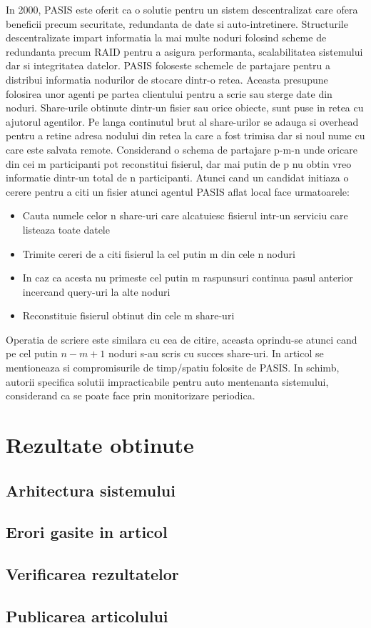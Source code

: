 \documentclass{llncs}
\begin{document}
In 2000, PASIS este oferit ca o solutie pentru un sistem descentralizat care ofera beneficii precum securitate, redundanta de date si auto-intretinere.
Structurile descentralizate impart informatia la mai multe noduri folosind scheme de redundanta precum RAID pentru a asigura performanta, scalabilitatea sistemului dar si integritatea datelor. \cite{Patterson:1988}
PASIS foloseste schemele de partajare pentru a distribui informatia nodurilor de stocare dintr-o retea. Aceasta presupune folosirea unor agenti pe partea clientului pentru a scrie sau sterge date din noduri. Share-urile obtinute dintr-un fisier sau orice obiecte, sunt puse in retea cu ajutorul agentilor. Pe langa continutul brut al share-urilor se adauga si overhead pentru a retine adresa nodului din retea la care a fost trimisa dar si noul nume cu care este salvata remote. Considerand o schema de partajare p-m-n unde oricare din cei m participanti pot reconstitui fisierul, dar mai putin de p nu obtin vreo informatie dintr-un total de n participanti. Atunci cand un candidat initiaza o cerere pentru a citi un fisier atunci agentul PASIS aflat local face urmatoarele: \cite{W:2000}
\begin{itemize}
	\item Cauta numele celor n share-uri care alcatuiesc fisierul intr-un serviciu care listeaza toate datele
	\item Trimite cereri de a citi fisierul la cel putin m din cele n noduri
	\item In caz ca acesta nu primeste cel putin m raspunsuri continua pasul anterior incercand query-uri la alte noduri
	\item Reconstituie fisierul obtinut din cele m share-uri
\end{itemize}
Operatia de scriere este similara cu cea de citire, aceasta oprindu-se atunci cand pe cel putin $n - m + 1$ noduri s-au scris cu succes share-uri.
In articol se mentioneaza si compromisurile de timp/spatiu folosite de PASIS. In schimb, autorii specifica solutii impracticabile pentru auto mentenanta sistemului, considerand ca se poate face prin monitorizare periodica.



\section{Rezultate obtinute}
\label{sec:results}
\subsection{Arhitectura sistemului}
\subsection{Erori gasite in articol}
\subsection{Verificarea rezultatelor}
\subsection{Publicarea articolului}

%
%
%



\end{document}
